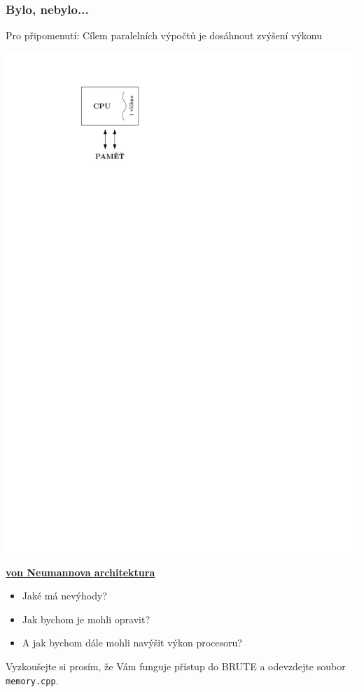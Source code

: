 \documentclass[usenames,dvipsnames,9pt]{beamer}
\newcommand{\see}[1]{\faEye\hspace{5pt}#1}
\begin{document}
\begin{frame}
  \frametitle{Bylo, nebylo...}
  Pro připomenutí: Cílem paralelních výpočtů je dosáhnout zvýšení výkonu
  \vfill
  \begin{minipage}{0.3\linewidth}
    \centering\includegraphics[width=0.7\linewidth]{01/figs/single_thread.pdf}
  \end{minipage}
  \hfill
  \begin{minipage}{0.6\linewidth}
    \textbf{\underline{von Neumannova architektura}}
    \begin{itemize}
      \item Jaké má nevýhody?
      \item Jak bychom je mohli opravit?
      \item A jak bychom dále mohli navýšit výkon procesoru?
    \end{itemize}
    \vspace{1em}
    \see{{\tt memory.cpp}}
  \end{minipage}

  \vspace{3em}

  \pause
  \alert{
    \Large
    Vyzkoušejte si prosím, že Vám funguje přístup do BRUTE a odevzdejte soubor \texttt{memory.cpp}.
  }
\end{frame}
\end{document}
